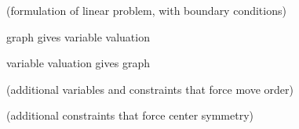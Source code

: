 (formulation of linear problem, with boundary conditions)

\begin{theorem}
  graph gives variable valuation
\end{theorem}

\begin{theorem}
  variable valuation gives graph
\end{theorem}

(additional variables and constraints that force move order)

(additional constraints that force center symmetry)
